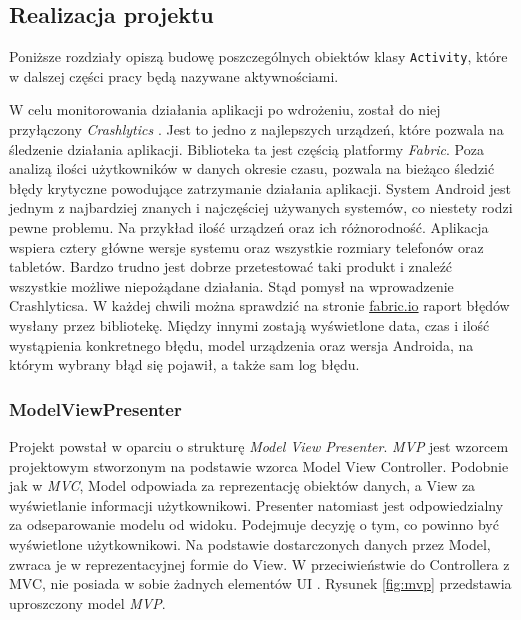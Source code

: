 \documentclass[twoside]{projektInzynierskiMS}
\begin{document}
\subsection{Realizacja projektu}

Poniższe rozdziały opiszą budowę poszczególnych obiektów klasy \verb`Activity`, które w dalszej części pracy będą nazywane aktywnościami. 

W celu monitorowania działania aplikacji po wdrożeniu, został do niej przyłączony \textit{Crashlytics} \cite{crashlytics}. Jest to jedno z najlepszych urządzeń, które pozwala na śledzenie działania aplikacji. Biblioteka ta jest częścią platformy \textit{Fabric}. Poza analizą ilości użytkowników w danych okresie czasu, pozwala na bieżąco śledzić błędy krytyczne powodujące zatrzymanie działania aplikacji. System Android jest jednym z najbardziej znanych i najczęściej używanych systemów, co niestety rodzi pewne problemu. Na przykład ilość urządzeń oraz ich różnorodność. Aplikacja wspiera cztery główne wersje systemu oraz wszystkie rozmiary telefonów oraz tabletów. Bardzo trudno jest dobrze przetestować taki produkt i znaleźć wszystkie możliwe niepożądane działania. Stąd pomysł na wprowadzenie Crashlyticsa. W każdej chwili można sprawdzić na stronie \href{https://fabric.io/}{fabric.io} raport błędów wysłany przez bibliotekę. Między innymi zostają wyświetlone data, czas i ilość wystąpienia konkretnego błędu, model urządzenia oraz wersja Androida, na którym wybrany błąd się pojawił, a także sam log błędu. 

\subsubsection{ModelViewPresenter}

Projekt powstał w oparciu o strukturę \textit{Model View Presenter}. \textit{MVP} jest wzorcem projektowym stworzonym na podstawie wzorca Model View Controller. Podobnie jak w \textit{MVC}, Model odpowiada za reprezentację obiektów danych, a View za wyświetlanie informacji użytkownikowi. Presenter natomiast jest odpowiedzialny za odseparowanie modelu od widoku. Podejmuje decyzję o tym, co powinno być wyświetlone użytkownikowi. Na podstawie dostarczonych danych przez Model, zwraca je w reprezentacyjnej formie do View. W przeciwieństwie do Controllera z MVC, nie posiada w sobie żadnych elementów UI \cite{mvpBook}. Rysunek \ref{fig:mvp} przedstawia uproszczony model \textit{MVP}.
\end{document}

